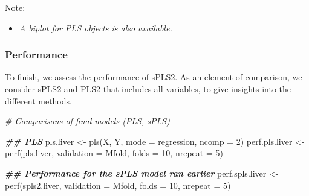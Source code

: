 \documentclass[
]{book}
\newenvironment{Shaded}{\begin{snugshade}}{\end{snugshade}}
\newcommand{\AttributeTok}[1]{\textcolor[rgb]{0.77,0.63,0.00}{#1}}
\newcommand{\CommentTok}[1]{\textcolor[rgb]{0.56,0.35,0.01}{\textit{#1}}}
\newcommand{\DecValTok}[1]{\textcolor[rgb]{0.00,0.00,0.81}{#1}}
\newcommand{\DocumentationTok}[1]{\textcolor[rgb]{0.56,0.35,0.01}{\textbf{\textit{#1}}}}
\newcommand{\FunctionTok}[1]{\textcolor[rgb]{0.00,0.00,0.00}{#1}}
\newcommand{\NormalTok}[1]{#1}
\newcommand{\OtherTok}[1]{\textcolor[rgb]{0.56,0.35,0.01}{#1}}
\newcommand{\StringTok}[1]{\textcolor[rgb]{0.31,0.60,0.02}{#1}}
\providecommand{\tightlist}{%
  \setlength{\itemsep}{0pt}\setlength{\parskip}{0pt}}
\begin{document}
Note:

\begin{itemize}
\tightlist
\item
  \emph{A biplot for PLS objects is also available.}
\end{itemize}

\hypertarget{04:spls2-perf}{%
\subsubsection{Performance}\label{04:spls2-perf}}

To finish, we assess the performance of sPLS2. As an element of comparison, we consider sPLS2 and PLS2 that includes all variables, to give insights into the different methods.

\begin{Shaded}
\begin{Highlighting}[]
\CommentTok{\# Comparisons of final models (PLS, sPLS)}

\DocumentationTok{\#\# PLS}
\NormalTok{pls.liver }\OtherTok{\textless{}{-}} \FunctionTok{pls}\NormalTok{(X, Y, }\AttributeTok{mode =} \StringTok{\textquotesingle{}regression\textquotesingle{}}\NormalTok{, }\AttributeTok{ncomp =} \DecValTok{2}\NormalTok{)}
\NormalTok{perf.pls.liver }\OtherTok{\textless{}{-}}  \FunctionTok{perf}\NormalTok{(pls.liver, }\AttributeTok{validation =} \StringTok{\textquotesingle{}Mfold\textquotesingle{}}\NormalTok{, }\AttributeTok{folds =} \DecValTok{10}\NormalTok{, }
                        \AttributeTok{nrepeat =} \DecValTok{5}\NormalTok{)}

\DocumentationTok{\#\# Performance for the sPLS model ran earlier}
\NormalTok{perf.spls.liver }\OtherTok{\textless{}{-}}  \FunctionTok{perf}\NormalTok{(spls2.liver, }\AttributeTok{validation =} \StringTok{\textquotesingle{}Mfold\textquotesingle{}}\NormalTok{, }\AttributeTok{folds =} \DecValTok{10}\NormalTok{, }
                         \AttributeTok{nrepeat =} \DecValTok{5}\NormalTok{)}
\end{Highlighting}
\end{Shaded}
\end{document}
